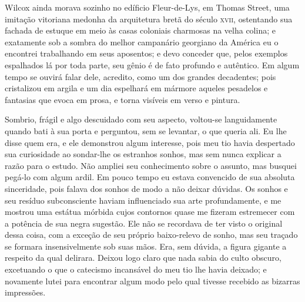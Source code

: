 \begin{pages}
\begin{Rightside}
Wilcox ainda morava sozinho no edíficio Fleur-de-Lys, em Thomas Street,
uma imitação vitoriana medonha da arquitetura bretã do século \textsc{xvii},
ostentando sua fachada de estuque em meio às casas coloniais charmosas
na velha colina; e exatamente sob a sombra do melhor campanário
georgiano da América eu o encontrei trabalhando em seus aposentos; e
devo conceder que, pelos exemplos espalhados lá por toda parte, seu
gênio é de fato profundo e autêntico. Em algum tempo se ouvirá falar
dele, acredito, como um dos grandes decadentes; pois cristalizou em
argila e um dia espelhará em mármore aqueles pesadelos e fantasias que
 evoca em prosa, e  torna visíveis em verso e pintura.

Sombrio, frágil e algo descuidado com seu aspecto, voltou-se
languidamente quando bati à sua porta e perguntou, sem se levantar, o
que queria ali. Eu lhe disse quem era, e ele demonstrou algum interesse,
pois meu tio havia despertado sua curiosidade ao sondar-lhe os estranhos
sonhos, mas sem nunca explicar a razão para o estudo. Não ampliei seu
conhecimento sobre o assunto, mas busquei pegá-lo com algum ardil. Em
pouco tempo eu estava convencido de sua absoluta sinceridade, pois
falava dos sonhos de modo a não deixar dúvidas. Os sonhos e seu resíduo
subconsciente haviam influenciado sua arte profundamente, e me mostrou
uma estátua mórbida cujos contornos quase me fizeram estremecer com a
potência de sua negra sugestão. Ele não se recordava de ter visto o
original dessa coisa, com a exceção de seu próprio baixo-relevo de
sonho, mas seu traçado se formara insensivelmente sob suas mãos. Era,
sem dúvida, a figura gigante a respeito da qual delirara. Deixou logo
claro que nada sabia do culto obscuro, excetuando o que o catecismo
incansável do meu tio lhe havia deixado; e novamente lutei para
encontrar algum modo pelo qual tivesse recebido as bizarras impressões.


\end{Rightside}
\end{pages}
